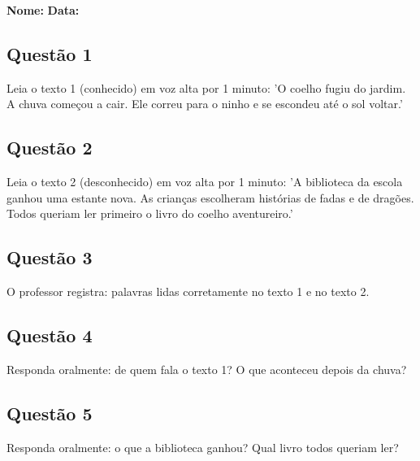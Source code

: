 \noindent\textbf{Nome:} \underline{\hspace{4cm}} \quad \textbf{Data:} \underline{\hspace{2cm}}

\subsection*{Questão 1}
Leia o texto 1 (conhecido) em voz alta por 1 minuto: 'O coelho fugiu do jardim. A chuva começou a cair. Ele correu para o ninho e se escondeu até o sol voltar.'

\begin{center}
  \underline{\hspace{12cm}}
\end{center}

\subsection*{Questão 2}
Leia o texto 2 (desconhecido) em voz alta por 1 minuto: 'A biblioteca da escola ganhou uma estante nova. As crianças escolheram histórias de fadas e de dragões. Todos queriam ler primeiro o livro do coelho aventureiro.'

\begin{center}
  \underline{\hspace{12cm}}
\end{center}

\subsection*{Questão 3}
O professor registra: palavras lidas corretamente no texto 1 e no texto 2.

\begin{center}
  \underline{\hspace{12cm}}
\end{center}

\subsection*{Questão 4}
Responda oralmente: de quem fala o texto 1? O que aconteceu depois da chuva?

\begin{center}
  \underline{\hspace{12cm}}
\end{center}

\subsection*{Questão 5}
Responda oralmente: o que a biblioteca ganhou? Qual livro todos queriam ler?

